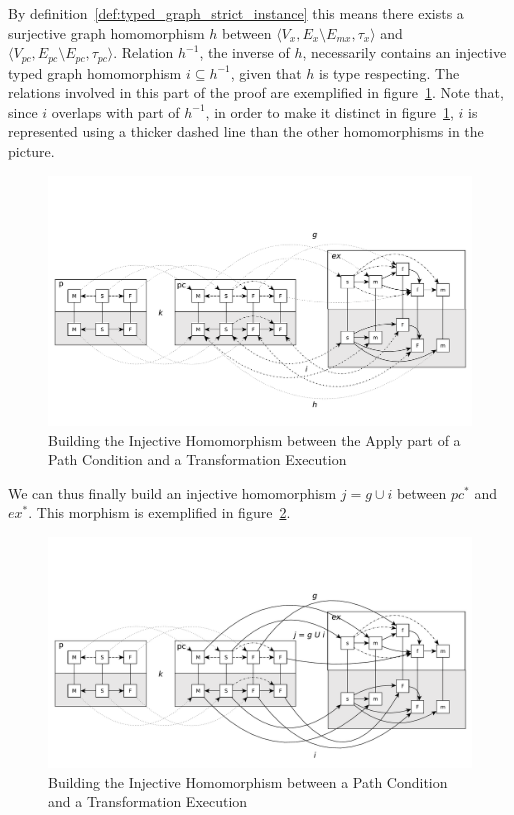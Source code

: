 \begin{pf}
By definition~\ref{def:typed_graph_strict_instance} this means there exists a
surjective graph homomorphism $h$ between $\langle V_x,E_x\setminus
E_{mx},\tau_x\rangle$ and $\langle V_{pc},E_{pc}\setminus
E_{pc},\tau_{pc}\rangle$. Relation $h^{-1}$, the inverse of $h$, necessarily
contains an injective typed graph homomorphism $i\subseteq h^{-1}$, given that $h$ is
type respecting. The relations involved in this part of the proof are
exemplified in figure~\ref{fig:proof_example_morphism_pc_to_ex_apply}. Note
that, since $i$ overlaps with part of $h^{-1}$, in order to make it distinct in
figure~\ref{fig:proof_example_morphism_pc_to_ex_apply}, $i$ is represented using
a thicker dashed line than the other homomorphisms in the picture. 
 
\begin{figure}[h!] \centering \includegraphics[scale=.35]{./figures/property_proving/proof_example_morphism_inverse_surjection.pdf}
	\caption{Building the Injective Homomorphism between the Apply part of a Path Condition and a Transformation Execution}
	\label{fig:proof_example_morphism_pc_to_ex_apply}
\end{figure}
We can thus finally build an injective homomorphism $j = g\cup i$ between $pc^*$ and
$ex^*$. This morphism is exemplified in figure~\ref{fig:proof_example_morphism_pc_to_ex}.

\begin{figure}[h!] \centering \includegraphics[scale=.35]{./figures/property_proving/proof_example_morphism_pc_to_ex.pdf}
	\caption{Building the Injective Homomorphism between a Path Condition and a Transformation Execution}
	\label{fig:proof_example_morphism_pc_to_ex}
\end{figure}


\end{pf}
